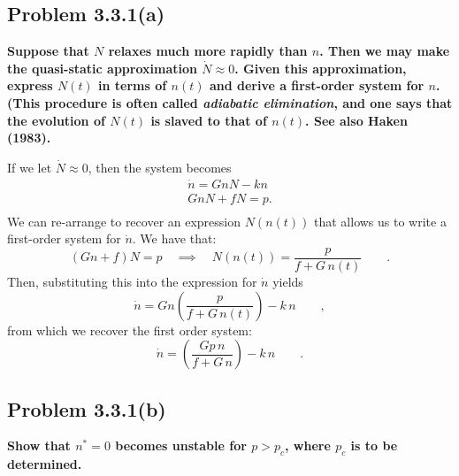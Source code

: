 \documentclass[draft]{agujournal2019}
\begin{document}
\subsection{Problem 3.3.1(a)}
\label{ssec:p4a}

\textbf{Suppose that $N$ relaxes much more rapidly than $n$. Then we may make the quasi-static approximation $\dot N\approx0$. Given this approximation, express $N(t)$ in terms of $n(t)$ and derive a first-order system for $n$. (This procedure is often called \textit{adiabatic elimination}, and one says that the evolution of $N(t)$ is slaved to that of $n(t)$. See also Haken (1983). }


If we let $\dot{N}\approx0$, then the system becomes 
\begin{align*}
    \dot n = Gn N - k n \\
     G n N + f N = p  .\\
\end{align*}
We can re-arrange to recover an expression $N(n(t))$ that allows us to write a first-order system for $\dot{n}$. We have that:
\begin{equation*}
    (G n + f)N = p \quad\implies\quad N(n(t)) = \frac{p}{f + G \, n(t) } \qquad . 
\end{equation*}
Then, substituting this into the expression for $\dot{n}$ yields
\begin{equation*}
    \dot{n} = Gn\left(\frac{p}{f + G \, n(t) }\right) - k\,n \qquad ,
\end{equation*}
from which we recover the first order system:
\begin{equation}
\label{eqn:p4}
    \dot{n} = \left(\frac{Gp\,n}{f + G \, n }\right) - k\,n \qquad .
\end{equation}



\subsection{Problem 3.3.1(b)}
\label{ssec:p4b}
\textbf{Show that $n^*=0$ becomes unstable for $p>p_c$, where $p_c$ is to be determined. }
\end{document}
